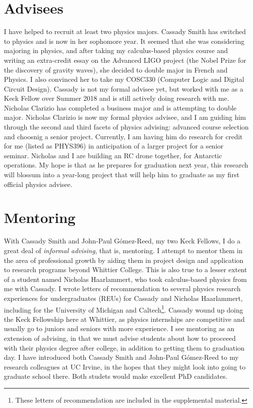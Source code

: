 \documentclass[../main.tex]{subfiles}
\begin{document}
\section{Advisees}

I have helped to recruit at least two physics majors.  Cassady Smith has switched to physics and is now in her sophomore year.  It seemed that she was considering majoring in physics, and after taking my calculus-based physics course and writing an extra-credit essay on the Advanced LIGO project (the Nobel Prize for the discovery of gravity waves), she decided to double major in French and Physics.  I also convinced her to take my COSC330 (Computer Logic and Digital Circuit Design).  Cassady is not my formal advisee yet, but worked with me as a Keck Fellow over Summer 2018 and is still actively doing research with me.  Nicholas Clarizio has completed a business major and is attempting to double major.  Nicholas Clarizio is now my formal physics advisee, and I am guiding him through the second and third facets of physics advising: advanced course selection and choosnig a senior project.  Currently, I am having him do research for credit for me (listed as PHYS396) in anticipation of a larger project for a senior seminar.  Nicholas and I are building an RC drone together, for Antarctic operations.  My hope is that as he prepares for graduation next year, this research will blossum into a year-long project that will help him to graduate as my first official physics advisee. \\ \hspace{0.1cm}

\section{Mentoring}

With Cassady Smith and John-Paul G\'{o}mez-Reed, my two Keck Fellows, I do a great deal of \textit{informal advising}, that is, mentoring.  I attempt to mentor them in the area of professional growth by aiding them in project design and application to research programs beyond Whittier College.  This is also true to a lesser extent of a student named Nicholas Haarlammert, who took calculus-based physics from me with Cassady.  I wrote letters of recommendation to several physics research experiences for undergraduates (REUs) for Cassady and Nicholas Haarlammert, including for the University of Michigan and Caltech\footnote{These letters of recommendation are included in the supplemental material.}.  Cassady wound up doing the Keck Fellowship here at Whittier, as physics internships are competitive and usually go to juniors and seniors with more experience.  I see mentoring as an extension of advising, in that we must advise students about how to proceeed with their physics degree after college, in addition to getting them to graduation day.  I have introduced both Cassady Smith and John-Paul G\'{o}mez-Reed to my research colleagues at UC Irvine, in the hopes that they might look into going to graduate school there.  Both studets would make excellent PhD candidates.
\end{document}
